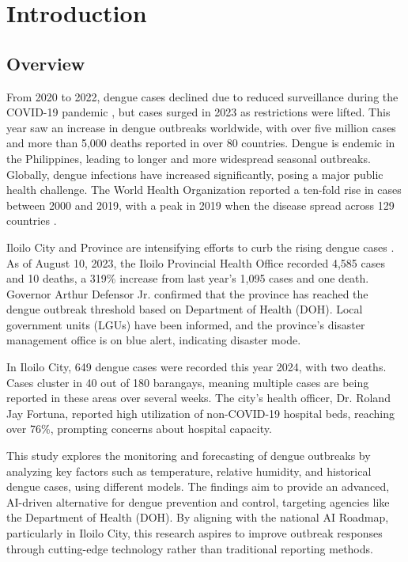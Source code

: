 \chapter{Introduction}
\label{sec:researchdesc}    %

\section{Overview}
\label{sec:overview}

From 2020 to 2022, dengue cases declined due to reduced surveillance during the COVID-19 pandemic \cite{WHO2023}, but cases surged in 2023 as restrictions were lifted. This year saw an increase in dengue outbreaks worldwide, with over five million cases and more than 5,000 deaths reported in over 80 countries. \cite{bosano2023who} Dengue is endemic in the Philippines, leading to longer and more widespread seasonal outbreaks. Globally, dengue infections have increased significantly, posing a major public health challenge. The World Health Organization reported a ten-fold rise in cases between 2000 and 2019, with a peak in 2019 when the disease spread across 129 countries \cite{WHO2024}.

Iloilo City and Province are intensifying efforts to curb the rising dengue cases \cite{PNA2024}. As of August 10, 2023, the Iloilo Provincial Health Office recorded 4,585 cases and 10 deaths, a 319\% increase from last year’s 1,095 cases and one death. Governor Arthur Defensor Jr. confirmed that the province has reached the dengue outbreak threshold based on Department of Health (DOH). Local government units (LGUs) have been informed, and the province's disaster management office is on blue alert, indicating disaster mode. \cite{lena2024}

In Iloilo City, 649 dengue cases were recorded this year 2024, with two deaths. Cases cluster in 40 out of 180 barangays, meaning multiple cases are being reported in these areas over several weeks. The city’s health officer, Dr. Roland Jay Fortuna, reported high utilization of non-COVID-19 hospital beds, reaching over 76\%, prompting concerns about hospital capacity.  

This study explores the monitoring and forecasting of dengue outbreaks by analyzing key factors such as temperature, relative humidity, and historical dengue cases, using different models. The findings aim to provide an advanced, AI-driven alternative for dengue prevention and control, targeting agencies like the Department of Health (DOH). By aligning with the national AI Roadmap, particularly in Iloilo City, this research aspires to improve outbreak responses through cutting-edge technology rather than traditional reporting methods.

